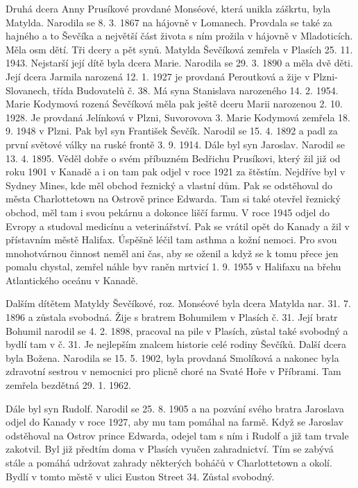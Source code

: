 \documentclass[../dejiny-rodu-prusiku.tex]{subfiles}
\begin{document}
Druhá dcera Anny Prusíkové provdané Monséové, která unikla záškrtu, byla Matylda. Narodila se 8. 3. 1867 na hájovně v Lomanech. Provdala se také za hajného a to Ševčíka a největší část života s ním prožila v hájovně v Mladoticích. Měla osm dětí. Tři dcery a pět synů. Matylda Ševčíková zemřela v Plasích 25. 11. 1943. Nejstarší její dítě byla dcera Marie. Narodila se 29. 3. 1890 a měla dvě děti. Její dcera Jarmila narozená 12. 1. 1927 je provdaná Peroutková a žije v Plzni-Slovanech, třída Budovatelů č. 38. Má syna Stanislava narozeného 14. 2. 1954. Marie Kodymová rozená Ševčíková měla pak ještě dceru Marii narozenou 2. 10. 1928. Je provdaná Jelínková v Plzni, Suvorovova 3. Marie Kodymová zemřela 18. 9. 1948 v Plzni. Pak byl syn František Ševčík. Narodil se 15. 4. 1892 a padl za první světové války na ruské frontě 3. 9. 1914. Dále byl syn Jaroslav. Narodil se 13. 4. 1895. Věděl dobře o svém příbuzném Bedřichu Prusíkovi, který žil již od roku 1901 v Kanadě a i on tam pak odjel v roce 1921 za štěstím. Nejdříve byl v Sydney Mines, kde měl obchod řeznický a vlastní dům. Pak se odstěhoval do města Charlottetown na Ostrově prince Edwarda. Tam si také otevřel řeznický obchod, měl tam i svou pekárnu a dokonce liščí farmu. V roce 1945 odjel do Evropy a studoval medicínu a veterinářství. Pak se vrátil opět do Kanady a žil v přístavním městě Halifax. Úspěšně léčil tam asthma a kožní nemoci. Pro svou mnohotvárnou činnost neměl ani čas, aby se oženil a když se k tomu přece jen pomalu chystal, zemřel náhle byv raněn mrtvicí 1. 9. 1955 v Halifaxu na břehu Atlantického oceánu v Kanadě.

Dalším dítětem Matyldy Ševčíkové, roz. Monséové byla dcera Matylda nar. 31. 7. 1896 a zůstala svobodná. Žije s bratrem Bohumilem v Plasích č. 31. Její bratr Bohumil narodil se 4. 2. 1898, pracoval na pile v Plasích, zůstal také svobodný a bydlí tam v č. 31. Je nejlepším znalcem historie celé rodiny Ševčíků. Další dcera byla Božena. Narodila se 15. 5. 1902, byla provdaná Smolíková a nakonec byla zdravotní sestrou v nemocnici pro plicně choré na Svaté Hoře v Příbrami. Tam zemřela bezdětná 29. 1. 1962.

Dále byl syn Rudolf. Narodil se 25. 8. 1905 a na pozvání svého bratra Jaroslava odjel do Kanady v roce 1927, aby mu tam pomáhal na farmě. Když se Jaroslav odstěhoval na Ostrov prince Edwarda, odejel tam s ním i Rudolf a již tam trvale zakotvil. Byl již předtím doma v Plasích vyučen zahradnictví. Tím se zabývá stále a pomáhá udržovat zahrady některých boháčů v Charlottetown a okolí. Bydlí v tomto městě v ulici Euston Street 34. Zůstal svobodný.
\end{document}
